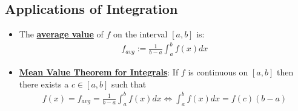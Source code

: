 \documentclass[reqno,11pt]{amsart}
\theoremstyle{definition}
\theoremstyle{remark}
\newcommand{\dfn}[1]{\underline{\textbf{#1}}}
\begin{document}
\subsection{Applications of Integration}
\begin{itemize}[noitemsep]
	\item  The \dfn{average value} of $f$ on the interval $[a,b]$ is: 
	\begin{align}
		f_{avg} := \frac{1}{b-a} \int_a^b f(x) dx 	
	\end{align}
	\item \dfn{Mean Value Theorem for Integrals}: If $f$ is continuous on $[a,b]$ then there exists a $c \in [a,b]$ such that
	\begin{align}
		f(x) = f_{avg} = \frac{1}{b-a} \int_a^b f(x) dx \iff \int_a^b f(x) dx = f(c) (b-a) 	
	\end{align}
\end{itemize}
\end{document}
